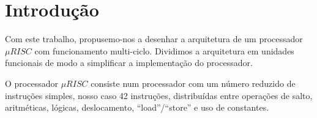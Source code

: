 \chapter{Introdução}
Com este trabalho, propusemo-nos a desenhar a arquitetura de um processador \mbox{$\mu RISC$} com funcionamento multi-ciclo. Dividimos a arquitetura em unidades funcionais de modo a simplificar a implementação do processador.\par
O processador \mbox{$\mu RISC$} consiste num processador com um número reduzido de instruções simples, nosso caso 42 instruções, distribuídas entre operações de salto, aritméticas, lógicas, deslocamento, ``load''/``store'' e uso de constantes.\par
